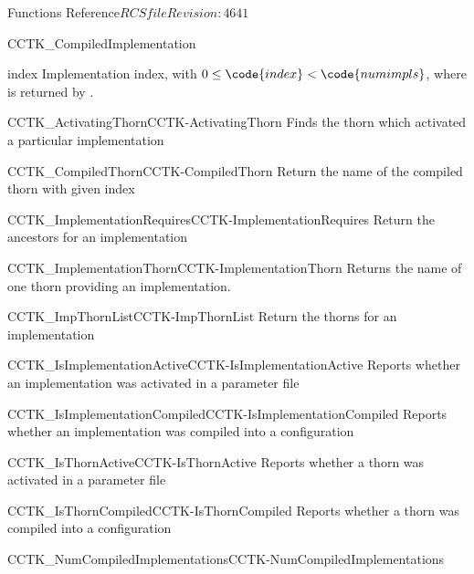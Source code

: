 \begin{cactuspart}{ Functions Reference}{$RCSfile$}{$Revision: 4641 $}
\begin{FunctionDescription}{CCTK\_CompiledImplementation}
\begin{ParameterSection}
\begin{Parameter}{index}
Implementation index, with $0 \le \code{index} < \code{numimpls}$,
where  is returned by
.
\end{Parameter}
\end{ParameterSection}

\begin{SeeAlsoSection}
\begin{SeeAlso2}{CCTK\_ActivatingThorn}{CCTK-ActivatingThorn}
  Finds the thorn which activated a particular implementation
\end{SeeAlso2}
\begin{SeeAlso2}{CCTK\_CompiledThorn}{CCTK-CompiledThorn}
  Return the name of the compiled thorn with given index
\end{SeeAlso2}
\begin{SeeAlso2}{CCTK\_ImplementationRequires}{CCTK-ImplementationRequires}
  Return the ancestors for an implementation
\end{SeeAlso2}
\begin{SeeAlso2}{CCTK\_ImplementationThorn}{CCTK-ImplementationThorn}
  Returns the name of one thorn providing an implementation.
\end{SeeAlso2}
\begin{SeeAlso2}{CCTK\_ImpThornList}{CCTK-ImpThornList}
  Return the thorns for an implementation
\end{SeeAlso2}
\begin{SeeAlso2}{CCTK\_IsImplementationActive}{CCTK-IsImplementationActive}
  Reports whether an implementation was activated in a parameter file
\end{SeeAlso2}
\begin{SeeAlso2}{CCTK\_IsImplementationCompiled}{CCTK-IsImplementationCompiled}
  Reports whether an implementation was compiled into a configuration
\end{SeeAlso2}
\begin{SeeAlso2}{CCTK\_IsThornActive}{CCTK-IsThornActive}
  Reports whether a thorn was activated in a parameter file
\end{SeeAlso2}
\begin{SeeAlso2}{CCTK\_IsThornCompiled}{CCTK-IsThornCompiled}
  Reports whether a thorn was compiled into a configuration
\end{SeeAlso2}
\begin{SeeAlso2}{CCTK\_NumCompiledImplementations}{CCTK-NumCompiledImplementations}

\end{SeeAlso2}
\end{SeeAlsoSection}
\end{FunctionDescription}
\end{cactuspart}
